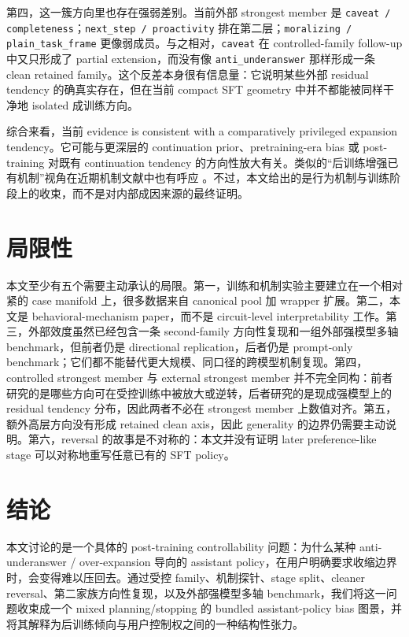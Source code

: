 \documentclass[12pt]{ctexart}
\begin{document}
第四，这一簇方向里也存在强弱差别。当前外部 strongest member 是 \texttt{caveat / completeness}；\texttt{next\_step / proactivity} 排在第二层；\texttt{moralizing / plain\_task\_frame} 更像弱成员。与之相对，\texttt{caveat} 在 controlled-family follow-up 中又只形成了 partial extension，而没有像 \texttt{anti\_underanswer} 那样形成一条 clean retained family。这个反差本身很有信息量：它说明某些外部 residual tendency 的确真实存在，但在当前 compact SFT geometry 中并不都能被同样干净地 isolated 成训练方向。

综合来看，当前 evidence is consistent with a comparatively privileged expansion tendency。它可能与更深层的 continuation prior、pretraining-era bias 或 post-training 对既有 continuation tendency 的方向性放大有关。类似的“后训练增强已有机制”视角在近期机制文献中也有呼应 \citep{prakash2024finetuning}。不过，本文给出的是行为机制与训练阶段上的收束，而不是对内部成因来源的最终证明。

\section{局限性}

本文至少有五个需要主动承认的局限。第一，训练和机制实验主要建立在一个相对紧的 case manifold 上，很多数据来自 canonical pool 加 wrapper 扩展。第二，本文是 behavioral-mechanism paper，而不是 circuit-level interpretability 工作。第三，外部效度虽然已经包含一条 second-family 方向性复现和一组外部强模型多轴 benchmark，但前者仍是 directional replication，后者仍是 prompt-only benchmark；它们都不能替代更大规模、同口径的跨模型机制复现。第四，controlled strongest member 与 external strongest member 并不完全同构：前者研究的是哪些方向可在受控训练中被放大或逆转，后者研究的是现成强模型上的 residual tendency 分布，因此两者不必在 strongest member 上数值对齐。第五，额外高层方向没有形成 retained clean axis，因此 generality 的边界仍需要主动说明。第六，reversal 的故事是不对称的：本文并没有证明 later preference-like stage 可以对称地重写任意已有的 SFT policy。

\section{结论}

本文讨论的是一个具体的 post-training controllability 问题：为什么某种 anti-underanswer / over-expansion 导向的 assistant policy，在用户明确要求收缩边界时，会变得难以压回去。通过受控 family、机制探针、stage split、cleaner reversal、第二家族方向性复现，以及外部强模型多轴 benchmark，我们将这一问题收束成一个 mixed planning/stopping 的 bundled assistant-policy bias 图景，并将其解释为后训练倾向与用户控制权之间的一种结构性张力。
\end{document}
